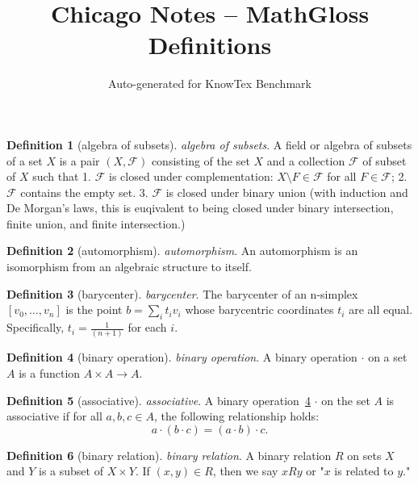 \documentclass[12pt,a4paper]{article}
\title{Chicago Notes -- MathGloss Definitions}
\author{Auto-generated for KnowTex Benchmark}
\date{}
\theoremstyle{definition}
\newtheorem{definition}{Definition}
\begin{document}
\maketitle

\begin{definition}[algebra of subsets]\label{def:algebra-of-subsets}
\emph{algebra of subsets}. A field or algebra of subsets of a set $X$ is a pair $(X, \mathcal F)$ consisting of the set $X$ and a collection $\mathcal F$ of subset of $X$ such that
1. $\mathcal F$ is closed under complementation: $X\setminus F \in \mathcal F$ for all $F \in \mathcal F$;
2. $\mathcal F$ contains the empty set. 
3. $\mathcal F$ is closed under binary union (with induction and De Morgan's laws, this is euqivalent to being closed under binary intersection, finite union, and finite intersection.)
\end{definition}

\begin{definition}[automorphism]\label{def:automorphism}
\emph{automorphism}. An automorphism is an isomorphism from an algebraic structure to itself.
\end{definition}

\begin{definition}[barycenter]\label{def:barycenter}
\emph{barycenter}. The barycenter of an n-simplex $[v_0,\dots,v_n]$ is the point $b=\sum_i t_iv_i$ whose barycentric coordinates $t_i$ are all equal. Specifically, $t_i = \frac{1}{(n+1)}$ for each $i$.
\end{definition}

\begin{definition}[binary operation]\label{def:binary-operation}
\emph{binary operation}. A binary operation $\cdot$ on a set $A$ is a function $A\times A\to A$.
\end{definition}

\begin{definition}[associative]\label{def:associative}
\emph{associative}. A binary operation~\ref{def:binary-operation} $\cdot$ on the set $A$ is associative if for all $a,b,c \in A$, the following relationship holds: $$a\cdot (b\cdot c) = (a\cdot b)\cdot c.$$
\end{definition}

\begin{definition}[binary relation]\label{def:binary-relation}
\emph{binary relation}. A binary relation $R$ on sets $X$ and $Y$ is a subset of $X \times Y$. If $(x,y) \in R$, then we say $xRy$ or "$x$ is related to $y$."
\end{definition}
\end{document}
